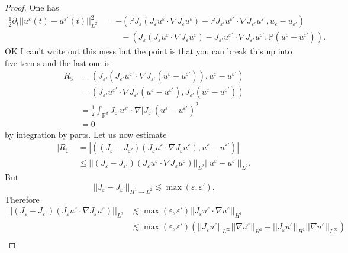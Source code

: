 \documentclass[12pt]{book}
\newcommand{\RR}{\mathbb{R}}
\newcommand{\PP}{\mathbb{P}}
\theoremstyle{definition}
\begin{document}
\begin{proof}
One has
\begin{align*}
\frac{1}{2} \partial_t ||u^\varepsilon(t) - u^{\varepsilon'}(t)||_{L^2}^2 &= -(\PP J_\varepsilon(J_\varepsilon u^\varepsilon \cdot \nabla J_\varepsilon u^\varepsilon) - \PP J_{\varepsilon'} u^{\varepsilon'} \cdot \nabla J_{\varepsilon'} u^{\varepsilon'}, u_\varepsilon - u_{\varepsilon'})\\
& \qquad -(J_\varepsilon(J_\varepsilon u^\varepsilon \cdot \nabla J_\varepsilon u^\varepsilon) - J_{\varepsilon'} u^{\varepsilon'} \cdot \nabla J_{\varepsilon'} u^{\varepsilon'}, \PP(u^\varepsilon - u^{\varepsilon'})).
\end{align*}
OK I can't write out this mess but the point is that you can break this up into five terms and the last one is
\begin{align*}R_5 &= (J_{\varepsilon'}(J_{\varepsilon'}u^{\varepsilon'} \cdot \nabla J_{\varepsilon'}(u^\varepsilon - u^{\varepsilon'})), u^\varepsilon - u^{\varepsilon'})\\
&= (J_{\varepsilon'}u^{\varepsilon'} \cdot \nabla J_{\varepsilon'}(u^\varepsilon - u^{\varepsilon'}), J_{\varepsilon'}(u^\varepsilon - u^{\varepsilon'}))\\
&= \frac{1}{2}\int_{\RR^d} J_{\varepsilon'} u^{\varepsilon'} \cdot \nabla |J_{\varepsilon'}(u^\varepsilon - u^{\varepsilon'})^2 \\
&= 0
\end{align*}
by integration by parts.
Let us now estimate
\begin{align*}
|R_1| &= |((J_\varepsilon - J_{\varepsilon'})(J_\varepsilon u^\varepsilon \cdot \nabla J_\varepsilon u^{\varepsilon}), u^\varepsilon - u^{\varepsilon'})|\\
&\leq ||(J_\varepsilon - J_{\varepsilon'})(J_\varepsilon u^\varepsilon \cdot \nabla J_\varepsilon u^{\varepsilon})||_{L^2} ||u^\varepsilon - u^{\varepsilon'}||_{L^2}.
\end{align*}
But
$$||J_\varepsilon - J_{\varepsilon'}||_{H^1 \to L^2} \lesssim \max(\varepsilon, \varepsilon').$$
Therefore
\begin{align*}
||(J_\varepsilon - J_{\varepsilon'})(J_\varepsilon u^\varepsilon \cdot \nabla J_\varepsilon u^{\varepsilon})||_{L^2} &\lesssim \max(\varepsilon, \varepsilon') ||J_\varepsilon u^\varepsilon \cdot \nabla u^\varepsilon||_{H^1}\\
&\lesssim \max(\varepsilon, \varepsilon') (||J_\varepsilon u^\varepsilon||_{L^\infty} ||\nabla u^\varepsilon||_{H^1} + ||J_\varepsilon u^\varepsilon||_{H^1} ||\nabla u^\varepsilon||_{L^\infty})\\

\end{align*}
\end{proof}
\end{document}
